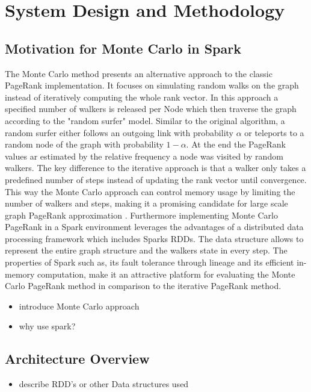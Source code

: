 \section{System Design and Methodology}
\subsection{Motivation for Monte Carlo in Spark}
The Monte Carlo method presents an alternative approach to the classic PageRank implementation. It focuses on simulating random walks on the graph instead of iteratively computing the whole rank vector. In this approach a specified number of walkers is released per Node which then traverse the graph according to the "random surfer" model. Similar to the original algorithm, a random surfer either follows an outgoing link with probability $\alpha$ or teleports to a random node of the graph with probability $1-\alpha$. At the end the PageRank values ar estimated by the relative frequency a node was visited by random walkers. The key difference to the iterative approach is that a walker only takes a predefined number of steps instead of updating the rank vector until convergence. This way the Monte Carlo approach can control memory usage by limiting the number of walkers and steps, making it a promising candidate for large scale graph PageRank approximation \cite{avrachenkov_monte_2007}. Furthermore implementing Monte Carlo PageRank in a Spark environment leverages the advantages of a distributed data processing framework which includes Sparks RDDs. The data structure allows to represent the entire graph structure and the walkers state in every step. The properties of Spark such as, its fault tolerance through lineage and its efficient in-memory computation, make it an attractive platform for evaluating the Monte Carlo PageRank method in comparison to the iterative PageRank method.



\begin{itemize}
    \item introduce Monte Carlo approach
    \item why use spark?
\end{itemize}

\subsection{Architecture Overview}
\begin{itemize}
    \item describe RDD's or other Data structures used
\end{itemize}

